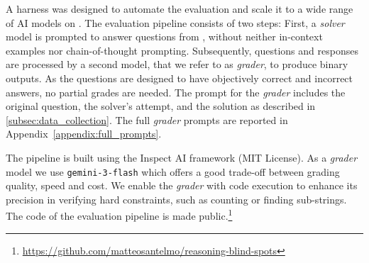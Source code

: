 
A harness was designed to automate the evaluation and scale it to a wide range of AI models on \bench. The evaluation pipeline consists of two steps: First, a \textit{solver} model is prompted to answer questions from \bench, without neither in-context examples nor chain-of-thought prompting. Subsequently, questions and responses are processed by a second model, that we refer to as \textit{grader}, to produce binary outputs. As the questions are designed to have objectively correct and incorrect answers, no partial grades are needed. The prompt for the \textit{grader} includes the original question, the solver's attempt, and the solution as described in \autoref{subsec:data_collection}. The full \textit{grader} prompts are reported in Appendix~\autoref{appendix:full_prompts}.

The pipeline is built using the Inspect AI \cite{UK_AI_Security_Institute_Inspect_AI_Framework_2024} framework (MIT License). As a \textit{grader} model we use \texttt{gemini-3-flash} which offers a good trade-off between grading quality, speed and cost. We enable the \textit{grader} with code execution to enhance its precision in verifying hard constraints, such as counting or finding sub-strings. The code of the evaluation pipeline is made public.\footnote{\url{https://github.com/matteosantelmo/reasoning-blind-spots}}